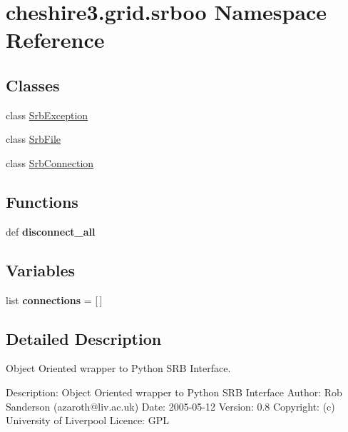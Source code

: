 \hypertarget{namespacecheshire3_1_1grid_1_1srboo}{\section{cheshire3.\-grid.\-srboo Namespace Reference}
\label{namespacecheshire3_1_1grid_1_1srboo}
}
\subsection*{Classes}
\begin{DoxyCompactItemize}
\item 
class \hyperlink{classcheshire3_1_1grid_1_1srboo_1_1_srb_exception}{Srb\-Exception}
\item 
class \hyperlink{classcheshire3_1_1grid_1_1srboo_1_1_srb_file}{Srb\-File}
\item 
class \hyperlink{classcheshire3_1_1grid_1_1srboo_1_1_srb_connection}{Srb\-Connection}
\end{DoxyCompactItemize}
\subsection*{Functions}
\begin{DoxyCompactItemize}
\item 
\hypertarget{namespacecheshire3_1_1grid_1_1srboo_ae6a77204d17540c88ed12e1a6f45c481}{def {\bfseries disconnect\-\_\-all}}\label{namespacecheshire3_1_1grid_1_1srboo_ae6a77204d17540c88ed12e1a6f45c481}

\end{DoxyCompactItemize}
\subsection*{Variables}
\begin{DoxyCompactItemize}
\item 
\hypertarget{namespacecheshire3_1_1grid_1_1srboo_a4ac03a9c956bd199f76d2eff172b95c0}{list {\bfseries connections} = \mbox{[}$\,$\mbox{]}}\label{namespacecheshire3_1_1grid_1_1srboo_a4ac03a9c956bd199f76d2eff172b95c0}

\end{DoxyCompactItemize}


\subsection{Detailed Description}
\begin{DoxyVerb}Object Oriented wrapper to Python SRB Interface.

Description: Object Oriented wrapper to Python SRB Interface
Author:      Rob Sanderson (azaroth@liv.ac.uk)
Date:        2005-05-12
Version:     0.8 
Copyright:   (c) University of Liverpool
Licence:     GPL\end{DoxyVerb}
 